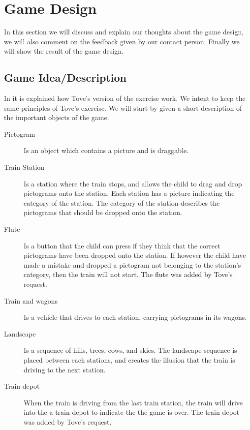 \section{Game Design}
In this section we will discuss and explain our thoughts about the game design, we will also comment on the feedback given by our contact person. Finally we will show the result of the game design.
\subsection{Game Idea/Description}
In  it is explained how Tove's version of the exercise work. We intent to keep the same principles of Tove's exercise. We will start by given a short description of the important objects of the game.

\begin{description}
\item[Pictogram] Is an object which contains a picture and is draggable.
\item[Train Station] Is a station where the train stops, and allows the child to drag and drop pictograms onto the station. Each station has a picture indicating the category of the station. The category of the station describes the pictograms that should be dropped onto the station.  

\item[Flute] Is a button that the child can press if they think that the correct pictograms have been dropped onto the station. If however the child have made a mistake and dropped a pictogram not belonging to the station's category, then the train will not start. The flute was added by Tove's request.

\item[Train and wagons] Is a vehicle that drives to each station, carrying pictograms in its wagons.

\item[Landscape] Is a sequence of hills, trees, cows, and skies. The landscape sequence is placed between each stations, and creates the illusion that the train is driving to the next station.

\item[Train depot] When the train is driving from the last train station, the train will drive into the a train depot to indicate the the game is over. The train depot was added by Tove's request.
\end{description}

